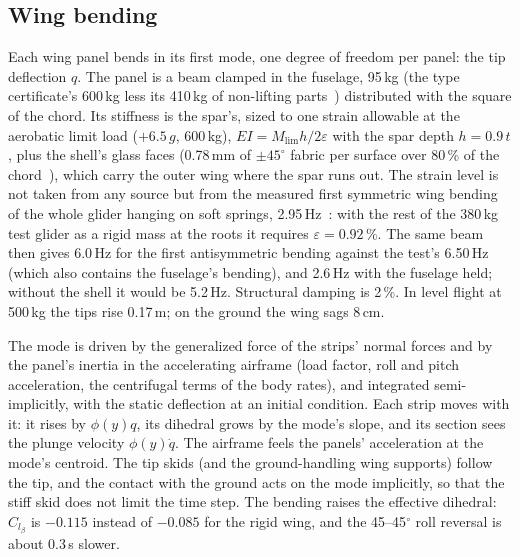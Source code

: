 \documentclass[10pt,a4paper,twocolumn]{article}
\begin{document}
\subsection{Wing bending}
Each wing panel bends in its first mode, one degree of freedom per panel: the tip deflection $q$. The panel is a beam clamped in the
fuselage, 95\,kg (the type certificate's 600\,kg less its 410\,kg of non-lifting parts~\cite{tcds}) distributed with the square of the
chord. Its stiffness is the spar's, sized to one strain allowable at the aerobatic limit load ($+6.5\,g$, 600\,kg), $EI=M_\text{lim}h/2\varepsilon$
with the spar depth $h=0.9\,t$, plus the shell's glass faces (0.78\,mm of $\pm45^\circ$ fabric per surface over 80\,\% of the chord~\cite{eller}),
which carry the outer wing where the spar runs out. The strain level is not taken from any source but from the measured first symmetric wing
bending of the whole glider hanging on soft springs, 2.95\,Hz~\cite{gvt}: with the rest of the 380\,kg test glider as a rigid mass at
the roots it requires $\varepsilon=0.92\,\%$. The same beam then gives 6.0\,Hz for the first antisymmetric bending against the test's
6.50\,Hz (which also contains the fuselage's bending), and 2.6\,Hz with the fuselage held; without the shell it would be 5.2\,Hz.
Structural damping is 2\,\%. In level flight at 500\,kg the tips rise 0.17\,m; on the ground the wing sags 8\,cm.

The mode is driven by the generalized force of the strips' normal forces and by the panel's inertia in the accelerating airframe
(load factor, roll and pitch acceleration, the centrifugal terms of the body rates), and integrated semi-implicitly, with the static
deflection at an initial condition. Each strip moves with it: it rises by $\phi(y)q$, its dihedral grows by the mode's slope, and its
section sees the plunge velocity $\phi(y)\dot q$. The airframe feels the panels' acceleration at the mode's centroid. The tip skids (and
the ground-handling wing supports) follow the tip, and the contact with the ground acts on the mode implicitly, so that the stiff skid
does not limit the time step. The bending raises the effective dihedral: $C_{l_\beta}$ is $-0.115$ instead of $-0.085$ for the rigid
wing, and the 45--45$^\circ$ roll reversal is about 0.3\,s slower.
\end{document}

